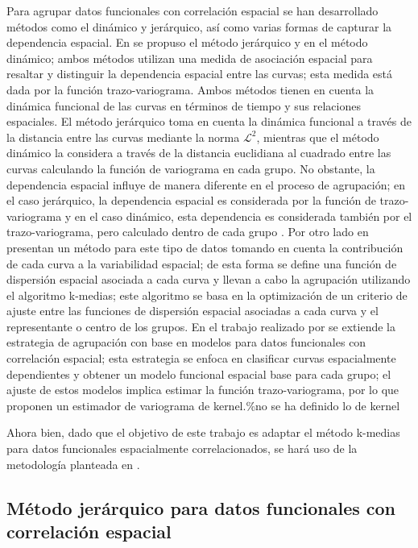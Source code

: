\documentclass[
]{book}
\begin{document}
Para agrupar datos funcionales con correlación espacial se han desarrollado métodos como el dinámico y jerárquico, así como varias formas de capturar la dependencia espacial. En \citep{Hclust} se propuso el método jerárquico y en \citep{RomanoDIN} el método dinámico; ambos métodos utilizan una medida de asociación espacial para resaltar y distinguir la dependencia espacial entre las curvas; esta medida está dada por la función trazo-variograma. Ambos métodos tienen en cuenta la dinámica funcional de las curvas en términos de tiempo y sus relaciones espaciales. El método jerárquico toma en cuenta la dinámica funcional a través de la distancia entre las curvas mediante la norma \(\mathcal{L}^2\), mientras que el método dinámico la considera a través de la distancia euclidiana al cuadrado entre las curvas calculando la función de variograma en cada grupo. No obstante, la dependencia espacial influye de manera diferente en el proceso de agrupación; en el caso jerárquico, la dependencia espacial es considerada por la función de trazo-variograma y en el caso dinámico, esta dependencia es considerada también por el trazo-variograma, pero calculado dentro de cada grupo \citep{Romano}. Por otro lado en \citep{Elvira} presentan un método para este tipo de datos tomando en cuenta la contribución de cada curva a la variabilidad espacial; de esta forma se define una función de dispersión espacial asociada a cada curva y llevan a cabo la agrupación utilizando el algoritmo k-medias; este algoritmo se basa en la optimización de un criterio de ajuste entre las funciones de dispersión espacial asociadas a cada curva y el representante o centro de los grupos. En el trabajo realizado por \citep{romanoNP} se extiende la estrategia de agrupación con base en modelos para datos funcionales con correlación espacial; esta estrategia se enfoca en clasificar curvas espacialmente dependientes y obtener un modelo funcional espacial base para cada grupo; el ajuste de estos modelos implica estimar la función trazo-variograma, por lo que proponen un estimador de variograma de kernel.\%no se ha definido lo de kernel

Ahora bien, dado que el objetivo de este trabajo es adaptar el método k-medias para datos funcionales espacialmente correlacionados, se hará uso de la metodología planteada en \citep{Hclust}.

\hypertarget{muxe9todo-jeruxe1rquico-para-datos-funcionales-con-correlaciuxf3n-espacial}{%
\subsection{Método jerárquico para datos funcionales con correlación espacial}\label{muxe9todo-jeruxe1rquico-para-datos-funcionales-con-correlaciuxf3n-espacial}}
\end{document}
